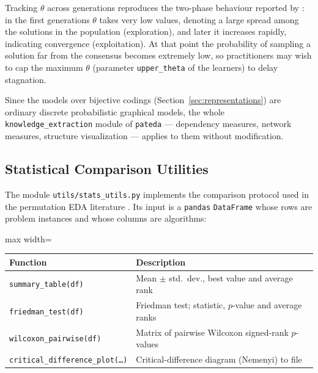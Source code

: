 \documentclass[a4paper,11pt]{article}
\begin{document}
Tracking $\theta$ across generations reproduces the two-phase behaviour reported
by \cite{Irurozki_et_al:2018}: in the first generations $\theta$ takes very low
values, denoting a large spread among the solutions in the population
(exploration), and later it increases rapidly, indicating convergence
(exploitation).  At that point the probability of sampling a solution far from
the consensus becomes extremely low, so practitioners may wish to cap the maximum
$\theta$ (parameter \texttt{upper\_theta} of the learners) to delay stagnation.

Since the models over bijective codings (Section~\ref{sec:representations}) are
ordinary discrete probabilistic graphical models, the whole
\texttt{knowledge\_extraction} module of \texttt{pateda} --- dependency measures,
network measures, structure visualization --- applies to them without
modification.

\subsection{Statistical Comparison Utilities}

The module \texttt{utils/stats\_utils.py} implements the comparison protocol used
in the permutation EDA literature \citep{Ceberio_et_al:2015,Demsar:2006}.  Its
input is a \texttt{pandas} \texttt{DataFrame} whose rows are problem instances
and whose columns are algorithms:

\begin{center}
\small
\setlength{\tabcolsep}{3pt}
\begin{adjustbox}{max width=\textwidth}
\begin{tabular}{lp{7.8cm}}
\toprule
Function & Description \\
\midrule
\texttt{summary\_table(df)} & Mean $\pm$ std.\ dev., best value and average rank \\
\texttt{friedman\_test(df)} & Friedman test; statistic, $p$-value and average ranks \\
\texttt{wilcoxon\_pairwise(df)} & Matrix of pairwise Wilcoxon signed-rank $p$-values \\
\texttt{critical\_difference\_plot(\ldots)} & Critical-difference diagram (Nemenyi) to file \\
\bottomrule
\end{tabular}
\end{adjustbox}
\end{center}

\end{document}
